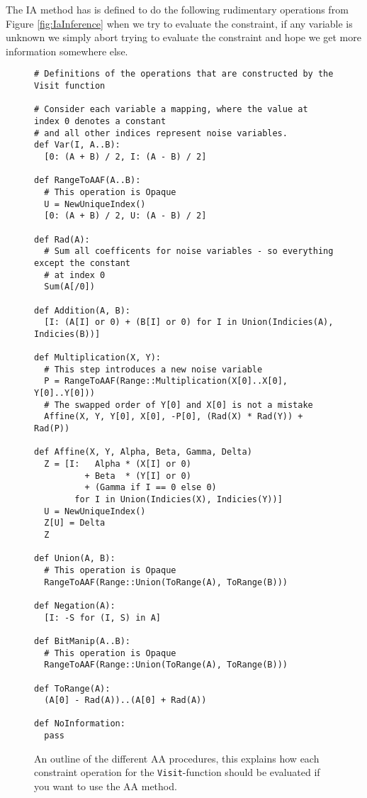 The IA method has is defined to do the following rudimentary operations from Figure \ref{fig:IaInference} when we try to evaluate the constraint, if any variable is unknown we simply abort trying to evaluate the constraint and hope we get more information somewhere else.

\begin{figure}
\begin{verbatim}
# Definitions of the operations that are constructed by the Visit function

# Consider each variable a mapping, where the value at index 0 denotes a constant
# and all other indices represent noise variables.
def Var(I, A..B):
  [0: (A + B) / 2, I: (A - B) / 2]

def RangeToAAF(A..B):
  # This operation is Opaque
  U = NewUniqueIndex()
  [0: (A + B) / 2, U: (A - B) / 2]

def Rad(A):
  # Sum all coefficents for noise variables - so everything except the constant
  # at index 0
  Sum(A[/0])

def Addition(A, B):
  [I: (A[I] or 0) + (B[I] or 0) for I in Union(Indicies(A), Indicies(B))]

def Multiplication(X, Y):
  # This step introduces a new noise variable
  P = RangeToAAF(Range::Multiplication(X[0]..X[0], Y[0]..Y[0]))
  # The swapped order of Y[0] and X[0] is not a mistake
  Affine(X, Y, Y[0], X[0], -P[0], (Rad(X) * Rad(Y)) + Rad(P))

def Affine(X, Y, Alpha, Beta, Gamma, Delta)
  Z = [I:   Alpha * (X[I] or 0)
          + Beta  * (Y[I] or 0)
          + (Gamma if I == 0 else 0)
        for I in Union(Indicies(X), Indicies(Y))]
  U = NewUniqueIndex()
  Z[U] = Delta
  Z

def Union(A, B):
  # This operation is Opaque
  RangeToAAF(Range::Union(ToRange(A), ToRange(B)))
  
def Negation(A):
  [I: -S for (I, S) in A]

def BitManip(A..B):
  # This operation is Opaque
  RangeToAAF(Range::Union(ToRange(A), ToRange(B)))

def ToRange(A):
  (A[0] - Rad(A))..(A[0] + Rad(A))

def NoInformation:
  pass

\end{verbatim}
  \cprotect\caption{An outline of the different AA procedures, this explains how each constraint operation for the \verb+Visit+-function should be evaluated if you want to use the AA method.}
\label{fig:AaInference}
\end{figure}


